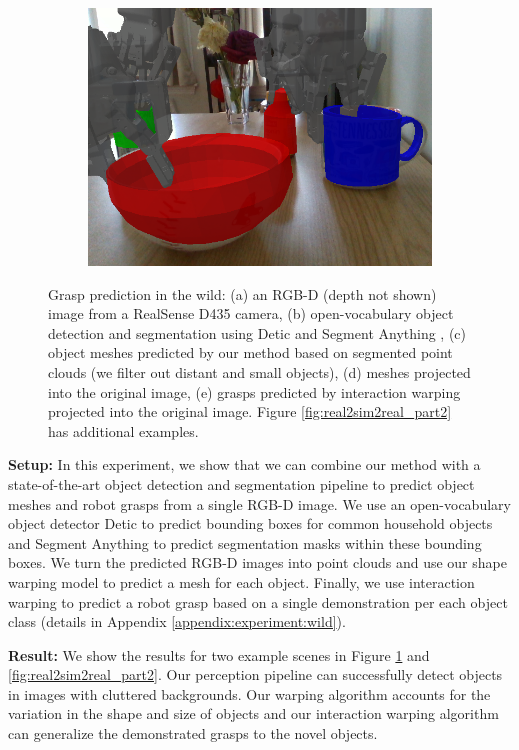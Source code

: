 \documentclass{article}
\begin{document}
\begin{figure}[]
\begin{subfigure}{(\linewidth - 0.05\linewidth)/5}
        \includegraphics[width=\linewidth]{figures/real2sim2real/5/4.png}
        \caption{}
    \end{subfigure}

    \caption{Grasp prediction in the wild: (a) an RGB-D (depth not shown) image from a RealSense D435 camera, (b) open-vocabulary object detection and segmentation using Detic \cite{zhou22detecting} and Segment Anything \cite{kirillov23segment}, (c) object meshes predicted by our method based on segmented point clouds (we filter out distant and small objects), (d) meshes projected into the original image, (e) grasps predicted by interaction warping projected into the original image. Figure \ref{fig:real2sim2real_part2} has additional examples.}
    \label{fig:real2sim2real}
\end{figure}

\textbf{Setup:} In this experiment, we show that we can combine our method with a state-of-the-art object detection and segmentation pipeline to predict object meshes and robot grasps from a single RGB-D image. We use an open-vocabulary object detector Detic \cite{zhou22detecting} to predict bounding boxes for common household objects and Segment Anything \cite{kirillov23segment} to predict segmentation masks within these bounding boxes. We turn the predicted RGB-D images into point clouds and use our shape warping model to predict a mesh for each object. Finally, we use interaction warping to predict a robot grasp based on a single demonstration per each object class (details in Appendix \ref{appendix:experiment:wild}).

\textbf{Result:} We show the results for two example scenes in Figure \ref{fig:real2sim2real} and \ref{fig:real2sim2real_part2}. Our perception pipeline can successfully detect objects in images with cluttered backgrounds. Our warping algorithm accounts for the variation in the shape and size of objects and our interaction warping algorithm can generalize the demonstrated grasps to the novel objects.
\end{document}
